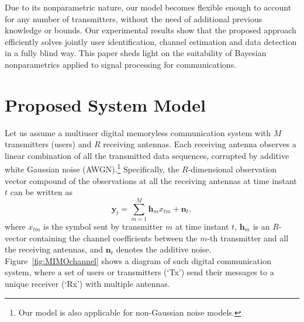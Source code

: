 \documentclass[a4paper]{article}
\def\yt{\mathbf{y}_t}
\def\nt{\mathbf{n}_t}
\def\hm{\mathbf{h}_m}
\def\xtm{x_{tm}}
\begin{document}
Due to its nonparametric nature, our model becomes flexible enough to account for any number of transmitters, without the need of additional previous knowledge or bounds. 
%
Our experimental results show that the proposed approach efficiently  solves jointly  user identification, channel estimation and
data detection in a fully blind way. This paper sheds light on the suitability of Bayesian nonparametrics applied to signal processing for communications.






\section{Proposed System Model}
\label{sec:approach}

Let us assume a multiuser digital memoryless communication system with $M$ transmitters (users) and $R$ receiving antennas. Each receiving antenna observes a linear combination of all the transmitted data sequences, corrupted by additive white Gaussian noise (AWGN).\footnote{Our model is also applicable for non-Gaussian noise models.} Specifically, the $R$-dimensional observation vector compound of the observations at all the receiving antennas at time instant $t$ can be written as
\begin{equation}
\yt = \sum_{m=1}^{M} \hm \xtm+\nt, \label{eq:Obs_eq}
\end{equation}
where $\xtm$ is the symbol sent by transmitter $m$ at time instant $t$, $\hm$ is an $R$-vector containing the channel coefficients between the $m$-th transmitter and all the receiving antennas, and $\nt$ denotes the additive noise. Figure~\ref{fig:MIMOchannel} shows a diagram of such digital communication system, where a set of users or transmitters (`Tx') send their messages to a unique receiver (`Rx') with multiple antennas.
\end{document}
